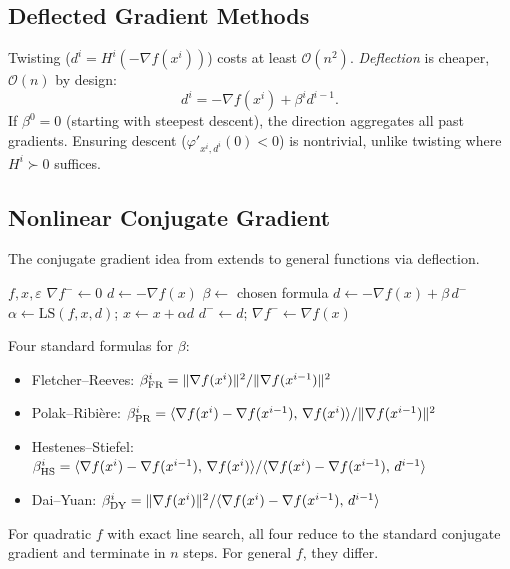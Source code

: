 \subsection{Deflected Gradient Methods}\label{sec:deflected}

Twisting ($d^i = H^i(-\nabla f(x^i))$) costs at least $\mathcal{O}(n^2)$.
\emph{Deflection} is cheaper, $\mathcal{O}(n)$ by design:
\begin{equation}\label{eq:deflected-gradient}
	d^i = -\nabla f(x^i) + \beta^i d^{i-1}.
\end{equation}
If $\beta^0 = 0$ (starting with steepest descent), the direction aggregates all past gradients.
Ensuring descent ($\varphi'_{x^i, d^i}(0) < 0$) is nontrivial, unlike twisting where $H^i \succ 0$ suffices.


\subsection{Nonlinear Conjugate Gradient}\label{sec:nonlinear-cg}

The conjugate gradient idea from  extends to general functions via deflection.

\begin{algorithm}
	\caption{Nonlinear Conjugate Gradient (NCG)}
	\begin{algorithmic}[1]
		\Require $f, x, \varepsilon$
			\State $\nabla f^- \gets 0$
					\State $d \gets -\nabla f(x)$ 
				\Else
					\State $\beta \gets$ chosen formula
					\State $d \gets -\nabla f(x) + \beta\, d^-$
				\EndIf
				\State $\alpha \gets \mathrm{LS}(f, x, d)$;\; $x \gets x + \alpha d$
				\State $d^- \gets d$;\; $\nabla f^- \gets \nabla f(x)$
			\EndWhile
		\EndProcedure
	\end{algorithmic}
\end{algorithm}

Four standard formulas for $\beta$:
\begin{itemize}
	\item Fletcher--Reeves: $\beta_{\mathrm{FR}}^i = \lVert\nabla f(x^i)\rVert^2 / \lVert\nabla f(x^{i-1})\rVert^2$
	\item Polak--Ribi\`ere: $\beta_{\mathrm{PR}}^i = \langle\nabla f(x^i) - \nabla f(x^{i-1}),\, \nabla f(x^i)\rangle / \lVert\nabla f(x^{i-1})\rVert^2$
	\item Hestenes--Stiefel: $\beta_{\mathrm{HS}}^i = \langle\nabla f(x^i) - \nabla f(x^{i-1}),\, \nabla f(x^i)\rangle / \langle\nabla f(x^i) - \nabla f(x^{i-1}),\, d^{i-1}\rangle$
	\item Dai--Yuan: $\beta_{\mathrm{DY}}^i = \lVert\nabla f(x^i)\rVert^2 / \langle\nabla f(x^i) - \nabla f(x^{i-1}),\, d^{i-1}\rangle$
\end{itemize}
For quadratic $f$ with exact line search, all four reduce to the standard conjugate gradient and terminate in $n$ steps.
For general $f$, they differ.

